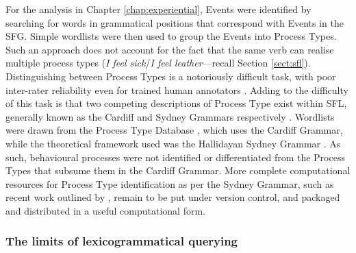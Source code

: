 For the  analysis in Chapter \ref{chap:experiential}, Events were identified by searching for words in grammatical positions that correspond with Events in the \gls{SFG}. Simple wordlists were then used to group the Events into Process Types. Such an approach does not account for the fact that the same verb can realise multiple process types (\emph{I feel sick}\slash\emph{I feel leather}---recall Section \ref{sect:sfl}). Distinguishing between Process Types is a notoriously difficult task, with poor inter\hyp{}rater reliability even for trained human annotators \cite{gwilliams_indeterminacy_2015,odonnell_survey_2009}. Adding to the difficulty of this task is that two competing descriptions of Process Type exist within \gls{SFL}, generally known as the Cardiff and Sydney Grammars respectively \cite{costetchi_method_2013}. Wordlists were drawn from the Process Type Database \cite{neale_more_2002}, which uses the Cardiff Grammar, while the theoretical framework used was the Hallidayan Sydney Grammar \cite[as described in e.g.][]{eggins_introduction_2004,halliday_introduction_2004}. As such, behavioural processes were not identified or differentiated from the Process Types that subsume them in the Cardiff Grammar. More complete computational resources for Process Type identification as per the Sydney Grammar, such as recent work outlined by \textcite{matthiessen_extending_2014}, remain to be put under version control, and packaged and distributed in a useful computational form.

\subsubsection{The limits of lexicogrammatical querying}

